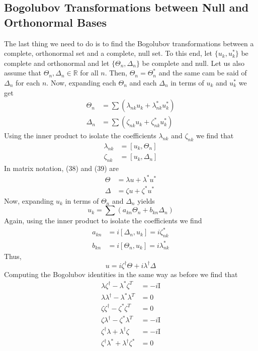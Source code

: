 \documentclass[letterpaper]{article}
\newcommand{\iip}[2]{\ensuremath{\left[#1,#2\right]}}
\newcommand{\parens}[1]{\ensuremath{\left(#1\right)}}
\begin{document}
\subsection{Bogolubov Transformations between Null and Orthonormal Bases}
The last thing we need to do is to find the Bogolubov transformations between a
complete, orthonormal set and a complete, null set. To this end, let $\{u_k,u_k^*\}$ be
complete and orthonormal and let $\{\Theta_n,\Delta_n\}$ be complete
and null. Let us also assume that $\Theta_n,\Delta_n\in\mathbb{R}$ for
all $n$. Then, $\Theta_n=\Theta_n^*$ and the same cam be said of
$\Delta_n$ for each $n$. Now, expanding each $\Theta_n$ and each
$\Delta_n$ in terms of $u_k$ and $u_k^*$ we get
\begin{align}
\Theta_n&=\sum\parens{\lambda_{nk}u_k+\lambda_{nk}^*u_k^*}\\
\Delta_n&=\sum\parens{\zeta_{nk}u_k+\zeta_{nk}^*u_k^*}
\end{align}
Using the inner product to isolate the coefficients $\lambda_{nk}$ and $\zeta_{nk}$ we
find that
\begin{align}
\lambda_{nk}&=\iip{u_k}{\Theta_n}\\
\zeta_{nk}&=\iip{u_k}{\Delta_n}
\end{align}
In matrix notation, (38) and (39) are
\begin{align}
\Theta&=\lambda u+\lambda^* u^*\\
\Delta&=\zeta u+\zeta^* u^*
\end{align}
Now, expanding $u_k$ in terms of $\Theta_n$ and $\Delta_n$ yields
\begin{equation}
u_k=\sum\parens{a_{kn}\Theta_n + b_{kn}\Delta_n}
\end{equation}
Again, using the inner product to isolate the coefficients we find
\begin{align}
a_{kn}&=i\iip{\Delta_n}{u_k}=i\zeta_{nk}^*\\
b_{kn}&=i\iip{\Theta_n}{u_k}=i\lambda_{nk}^*
\end{align}
Thus,
\begin{equation}
u=i\zeta^\dag\Theta+i\lambda^\dag\Delta
\end{equation}
Computing the Bogolubov identities in the same way as before we find that
\begin{align}
\lambda\zeta^\dag-\lambda^*\zeta^T&=-i\mathrm{I}\\
\lambda\lambda^\dag-\lambda^*\lambda^T&=0\\
\zeta\zeta^\dag-\zeta^*\zeta^T&=0\\
\zeta\lambda^\dag-\zeta^*\lambda^T&=-i\mathrm{I}\\
\zeta^\dag\lambda+\lambda^\dag\zeta&=-i\mathrm{I}\\
\zeta^\dag\lambda^*+\lambda^\dag\zeta^*&=0
\end{align}
\end{document}

